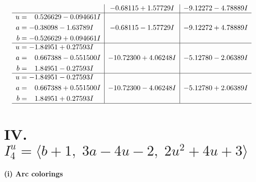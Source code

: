 \documentclass[1p]{elsarticle_modified}
\theoremstyle{definition}
\begin{document}
$$\begin{array}{c|c|c}
 & -0.68115 + 1.57729 I & -9.12272 - 4.78889 I \\ \hline\begin{aligned}
u &= \phantom{-}0.526629 - 0.094661 I \\
a &= -0.38098 - 1.63789 I \\
b &= -0.526629 + 0.094661 I\end{aligned}
 & -0.68115 - 1.57729 I & -9.12272 + 4.78889 I \\ \hline\begin{aligned}
u &= -1.84951 + 0.27593 I \\
a &= \phantom{-}0.667388 - 0.551500 I \\
b &= \phantom{-}1.84951 - 0.27593 I\end{aligned}
 & -10.72300 + 4.06248 I & -5.12780 - 2.06389 I \\ \hline\begin{aligned}
u &= -1.84951 - 0.27593 I \\
a &= \phantom{-}0.667388 + 0.551500 I \\
b &= \phantom{-}1.84951 + 0.27593 I\end{aligned}
 & -10.72300 - 4.06248 I & -5.12780 + 2.06389 I\\
 \hline 
 \end{array}$$\newpage\newpage\renewcommand{\arraystretch}{1}
\centering \section*{IV. $I^u_{4}= \langle b+1,\;3 a-4 u-2,\;2 u^2+4 u+3 \rangle$}
\flushleft \textbf{(i) Arc colorings}\\
\end{document}
